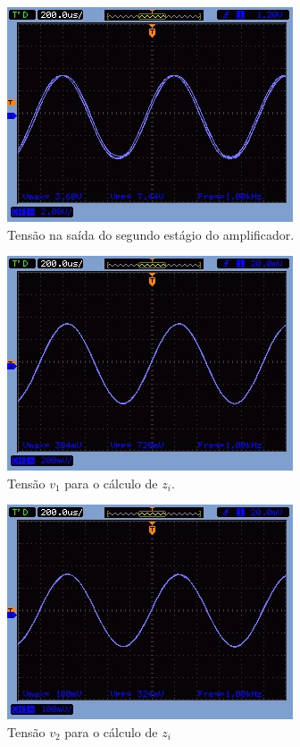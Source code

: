 \begin{figure}[H] 
\includegraphics[scale=0.6]{imagens/744Vpp.jpg} 
\centering
\caption{Tensão na saída do segundo estágio do amplificador.}
\label{fig:3} 
\end{figure} 

\begin{figure}[H] 
\includegraphics[scale=0.6]{imagens/720mVpp.jpg} 
\centering
\caption{Tensão $v_1$ para o cálculo de $z_i$.}
\label{fig:4} 
\end{figure} 

\begin{figure}[H] 
\includegraphics[scale=0.6]{imagens/324mVpp.jpg} 
\centering
\caption{Tensão $v_2$ para o cálculo de $z_i$}
\label{fig:5} 
\end{figure} 


